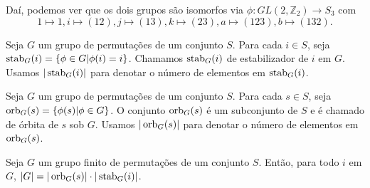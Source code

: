 	\par\vspace{0.3cm} Daí, podemos ver que os dois grupos são isomorfos via $\phi:GL(2, \mathbb{Z}_2)\to S_3$ com 
	\begin{equation*}
	1\mapsto 1, i\mapsto(12), j\mapsto(13), k\mapsto(23), a\mapsto(123), b\mapsto(132).
	\end{equation*}
	\par\vspace{0.3cm}
	
	\begin{deff}
		\label{def estabilizador}
		Seja $G$ um grupo de permutações de um conjunto $S$. Para cada $i\in S$, seja $\operatorname{stab}_G(i) = \{ \phi\in G | \phi(i) = i\}$. Chamamos $\operatorname{stab}_G(i)$ de estabilizador de $i$ em $G$. Usamos $|\operatorname{stab}_G(i)|$ para denotar o número de elementos em $\operatorname{stab}_G(i)$.
	\end{deff}
	
	\begin{deff}
		\label{def orbita}
		Seja $G$ um grupo de permutações de um conjunto $S$. Para cada $s\in S$, seja $\operatorname{orb}_G(s) = \{ \phi(s) | \phi\in G \}$. O conjunto $\operatorname{orb}_G(s)$ é um subconjunto de $S$ e é chamado de órbita de $s$ sob $G$. Usamos $|\operatorname{orb}_G(s)|$ para denotar o número de elementos em $\operatorname{orb}_G(s)$.
	\end{deff}
	
	\begin{theorem}
		\label{orb-stab}
		Seja $G$ um grupo finito de permutações de um conjunto $S$. Então, para todo $i$ em $G$, $|G| = |\operatorname{orb}_G(s)|\cdot|\operatorname{stab}_G(i)|$.
	\end{theorem}
	
